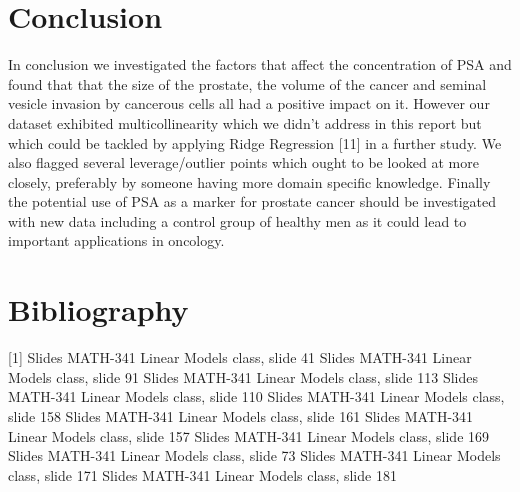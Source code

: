 \documentclass[10pt]{article}
\begin{document}
\section{Conclusion}

\quad In conclusion we investigated the factors that affect the concentration of PSA and found that that the size of the prostate, the volume of the cancer and seminal vesicle invasion by cancerous cells all had a positive impact on it. However our dataset exhibited multicollinearity which we didn't address in this report but which could be tackled by applying Ridge Regression [11] in a further study. We also flagged several leverage/outlier points which ought to be looked at more closely, preferably by someone having more domain specific knowledge. Finally the potential use of PSA as a marker for prostate cancer should be investigated with new data including a control group of healthy men as it could lead to important applications in oncology.

\newpage

\section{Bibliography}

[1] Slides MATH-341 Linear Models class, slide 41 \newline
[2] Slides MATH-341 Linear Models class, slide 91 \newline
[3] Slides MATH-341 Linear Models class, slide 113 \newline
[4]Slides MATH-341 Linear Models class, slide 110 \newline
[5] Slides MATH-341 Linear Models class, slide 158 \newline
[6] Slides MATH-341 Linear Models class, slide 161 \newline
[7] Slides MATH-341 Linear Models class, slide 157 \newline
[8] Slides MATH-341 Linear Models class, slide 169 \newline
[9] Slides MATH-341 Linear Models class, slide 73 \newline
[10] Slides MATH-341 Linear Models class, slide 171 \newline
[11] Slides MATH-341 Linear Models class, slide 181 \newline
\end{document}
